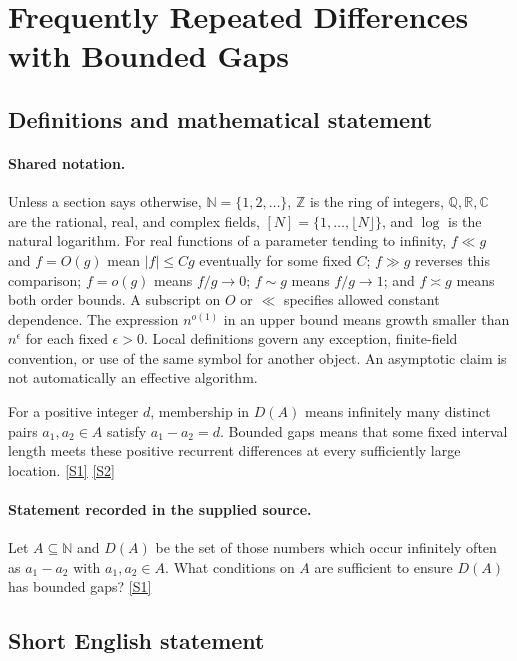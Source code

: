 \documentclass[11pt,a4paper]{article}
\newcommand{\N}{\mathbb{N}}
\newcommand{\Z}{\mathbb{Z}}
\newcommand{\Q}{\mathbb{Q}}
\newcommand{\R}{\mathbb{R}}
\newcommand{\C}{\mathbb{C}}
\newcommand{\sref}[2]{\hyperlink{source:#1:#2}{[S#2]}}
\begin{document}
\section{Frequently Repeated Differences with Bounded Gaps}\label{statement}


\subsection{Definitions and mathematical statement}

\paragraph{Shared notation.}Unless a section says otherwise, $\N=\{1,2,\ldots\}$,
$\Z$ is the ring of integers, $\Q,\R,\C$ are the rational, real, and complex
fields, $[N]=\{1,\ldots,\lfloor N\rfloor\}$, and $\log$ is the natural
logarithm. For real functions of a parameter tending to infinity,
$f\ll g$ and $f=O(g)$ mean $|f|\leq Cg$ eventually for some fixed $C$;
$f\gg g$ reverses this comparison; $f=o(g)$ means $f/g\to0$;
$f\sim g$ means $f/g\to1$; and $f\asymp g$ means both order bounds.
A subscript on $O$ or $\ll$ specifies allowed constant dependence.
The expression $n^{o(1)}$ in an upper bound means growth smaller than
$n^\epsilon$ for each fixed $\epsilon>0$. Local definitions govern any
exception, finite-field convention, or use of the same symbol for another
object. An asymptotic claim is not automatically an effective algorithm.



For a positive integer $d$, membership in $D(A)$ means infinitely many distinct pairs $a_1,a_2\in A$ satisfy $a_1-a_2=d$. Bounded gaps means that some fixed interval length meets these positive recurrent differences at every sufficiently large location. \sref{statement}{1} \sref{statement}{2}

\paragraph{Statement recorded in the supplied source.}
Let $A\subseteq \mathbb{N}$ and $D(A)$ be the set of those numbers which occur infinitely often as $a_1-a_2$ with $a_1,a_2\in A$. What conditions on $A$ are sufficient to ensure $D(A)$ has bounded gaps? \sref{statement}{1}

\subsection{Short English statement}
\end{document}
